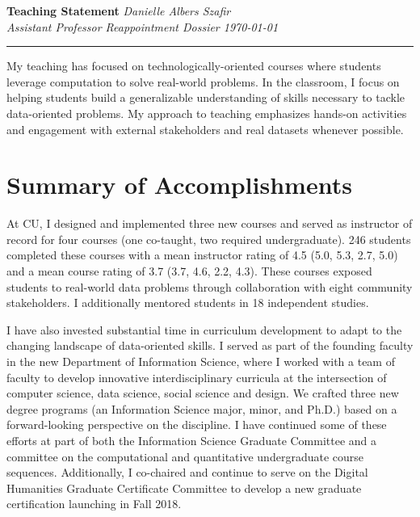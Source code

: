 \documentclass[11pt]{article}
\begin{document}
\setlength{\belowcaptionskip}{-10pt}

\thispagestyle{fancy}

\textbf{\Large Teaching Statement}
{\hspace{220pt}\emph{Danielle Albers Szafir\\Assistant Professor Reappointment Dossier \hspace{185pt}\today} \vspace{3pt}}
\hrule

My teaching has focused on technologically-oriented courses where students leverage computation to solve real-world problems. In the classroom, I focus on helping students build a generalizable understanding of skills necessary to tackle data-oriented problems. My approach to teaching emphasizes hands-on activities and engagement with external stakeholders and real datasets whenever possible. 

\section*{Summary of Accomplishments}

At CU, I designed and implemented three new courses and served as instructor of record for four courses (one co-taught, two required undergraduate). 246 students completed these courses with a mean instructor rating of 4.5 (5.0, 5.3, 2.7, 5.0) and a mean course rating of 3.7 (3.7, 4.6, 2.2, 4.3). These courses exposed students to real-world data problems through collaboration with eight community stakeholders. I additionally mentored students in 18 independent studies. 

I have also invested substantial time in curriculum development to adapt to the changing landscape of data-oriented skills. I served as part of the founding faculty in the new Department of Information Science, where I worked with a team of faculty to develop innovative interdisciplinary curricula at the intersection of computer science, data science, social science and design. We crafted three new degree programs (an Information Science major, minor, and Ph.D.) based on a forward-looking perspective on the discipline. I have continued some of these efforts at part of both the Information Science Graduate Committee and a committee on the computational and quantitative undergraduate course sequences. Additionally, I co-chaired and continue to serve on the Digital Humanities Graduate Certificate Committee to develop a new graduate certification launching in Fall 2018. 
\end{document}
